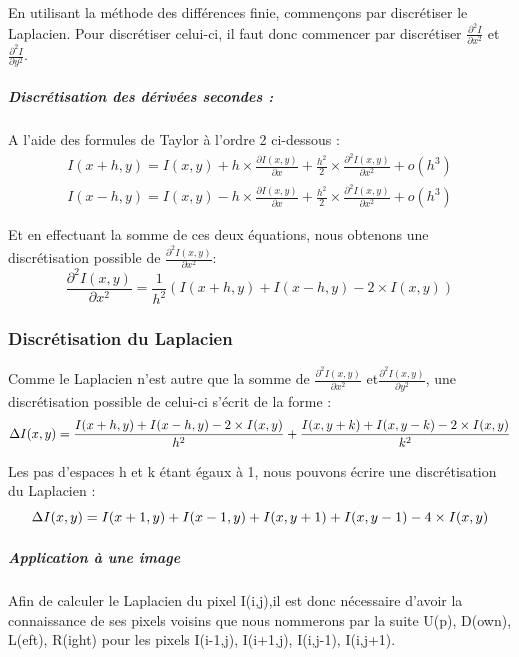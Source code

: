 En utilisant la méthode des différences finie, commençons par discrétiser le Laplacien.
Pour discrétiser celui-ci, il faut donc commencer par discrétiser $\frac{\partial^2 I}{\partial x^2}$ et  $\frac{\partial^2 I}{\partial y^2}$. 

\subparagraph{Discrétisation des dérivées secondes :}

A l'aide des formules de Taylor à l'ordre 2 ci-dessous : 
\begin{equation*}
\begin{aligned}
    I(x+h,y) = I(x,y)+h\times \frac{\partial I(x,y)}{\partial x}+ \frac{h^2}{2} \times \frac{\partial ^2 I(x,y)}{\partial x^2} + o(h^3) \\
    I(x-h,y) =I(x,y)- h\times  \frac{\partial I(x,y)}{\partial x}+ \frac{h^2}{2} \times \frac{\partial^2 I(x,y)}{\partial x^2} + o(h^3)
\end{aligned}
\end{equation*}


Et en effectuant la somme de ces deux équations, nous obtenons une discrétisation possible de $\frac{\partial ^2 I(x,y)}{\partial x^2}$:  
\begin{equation*}
    \frac{\partial ^2 I(x,y)}{\partial x^2} =\frac{1}{h^2}\left( I(x+h,y) + I(x-h,y) - 2\times I(x,y)\right)
\end{equation*}

\subsubsection{Discrétisation du Laplacien}
Comme le Laplacien n'est autre que la somme de $\frac{\partial ^2 I(x,y)}{\partial x^2}$ et$\frac{\partial ^2 I(x,y)}{\partial y^2}$, une discrétisation possible de celui-ci s'écrit de la forme  : 
\begin{equation*}
    \Delta I(x,y) =  \frac{I(x+h,y) + I(x-h,y) - 2\times I(x,y)}{h^2}  + \frac{I(x,y+k) + I(x,y-k) - 2\times I(x,y)}{k^2} \\
\end{equation*}

Les pas d'espaces h et k étant égaux à 1, nous pouvons écrire une discrétisation du Laplacien  :
\begin{equation*}
     \Delta I(x,y) =  I(x+1,y) + I(x-1,y)+ I(x,y+1) + I(x,y-1) - 4\times I(x,y)  \\
\end{equation*}

\subparagraph{Application à une image }
Afin de calculer le Laplacien du pixel I(i,j),il est donc nécessaire d'avoir la connaissance de ses pixels voisins que nous nommerons par la suite U(p), D(own), L(eft), R(ight) pour les pixels I(i-1,j), I(i+1,j), I(i,j-1), I(i,j+1). 

